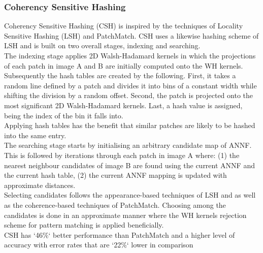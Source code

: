 \subsubsection{Coherency Sensitive Hashing}
Coherency Sensitive Hashing (CSH) is inspired by the techniques of Locality Sensitive Hashing (LSH) and PatchMatch. CSH uses a likewise hashing scheme of LSH and is built on two overall stages, indexing and searching. 
\\[2mm]
The indexing stage applies 2D Walsh-Hadamard kernels in which the projections of each patch in image A and B are initially computed onto the WH kernels. Subsequently the hash tables are created by the following. First, it takes a random line defined by a patch and divides it into bins of a constant width while shifting the division by a random offset. Second, the patch is projected onto the most significant 2D Walsh-Hadamard kernels. Last, a hash value is assigned, being the index of the bin it falls into. 
\\[2mm]
Applying hash tables has the benefit that similar patches are likely to be hashed into the same entry. 
\\[2mm]
The searching stage starts by initialising an arbitrary candidate map of ANNF. This is followed by iterations through each patch in image A where: (1) the nearest neighbour candidates of image B are found using the current ANNF and the current hash table, (2) the current ANNF mapping is updated with approximate distances. 
\\[2mm]
Selecting candidates follows the appearance-based techniques of LSH and as well as the coherence-based techniques of PatchMatch. Choosing among the candidates is done in an approximate manner where the WH kernels rejection scheme for pattern matching is applied beneficially. 
\\[2mm]
CSH has `46\%` better performance than PatchMatch and a higher level of accuracy with error rates that are `22\%` lower in comparison






